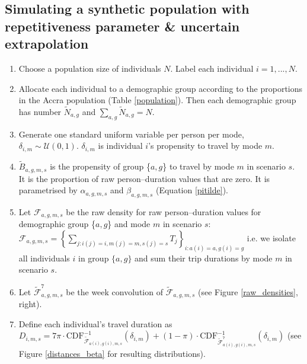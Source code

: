 \documentclass{article}
\begin{document}
\begin{appendix}
\subsection{Simulating a synthetic population with repetitiveness parameter \& uncertain extrapolation}\label{synthpop2}

\begin{enumerate}
\item Choose a population size of individuals ${N}$. Label each individual $i=1,...,N$.
\item Allocate each individual to a demographic group according to the proportions in the Accra population (Table \ref{population}). Then each demographic group has number $\tilde{N}_{a,g}$ and  $\sum_{a,g}\tilde{N}_{a,g}=N$.
\item Generate one standard uniform variable per person per mode, $\delta_{i,m}\sim\mathcal{U}(0,1)$. $\delta_{i,m}$ is individual $i$'s propensity to travel by mode $m$. 
\item $\tilde{B}_{a,g,m,s}$ is the propensity of group \{$a,g$\} to travel by mode $m$ in scenario $s$. It is the proportion of raw person--duration values that are zero. It is parametrised by $\alpha_{a,g,m,s}$ and $\beta_{a,g,m,s}$ (Equation \ref{pitilde}). 
\item Let $\mathcal{F}_{a,g,m,s}$ be the raw density for raw person--duration values for demographic group  \{$a,g$\} and mode $m$ in scenario $s$: $\mathcal{F}_{a,g,m,s}=\left\{\sum_{j:i(j)=i,m(j)=m,s(j)=s} T_j\right\}_{i:a(i)=a,g(i)=g}$ i.e. we isolate all individuals $i$ in group $\{a,g\}$ and sum their trip durations by mode $m$ in scenario $s$.%
\item Let $\tilde{\mathcal{F}}_{a,g,m,s}^7$ be the week convolution of $\tilde{\mathcal{F}}_{a,g,m,s}$ (see Figure \ref{raw_densities}, right).
\item Define each individual's travel duration as $D_{i,m,s}=7\pi\cdot\text{CDF}_{\tilde{\mathcal{F}}_{a(i),g(i),m,s}}^{-1}(\delta_{i,m})+(1-\pi)\cdot\text{CDF}_{\tilde{\mathcal{F}}_{a(i),g(i),m,s}^7}^{-1}(\delta_{i,m})$ (see Figure \ref{distances_beta} for resulting distributions).
\end{enumerate}


\end{appendix}
\end{document}
